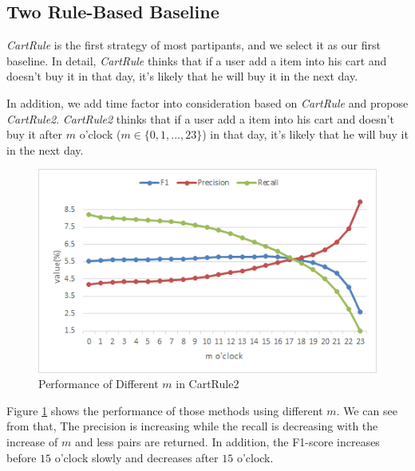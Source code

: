 \documentclass{llncs}
\begin{document}
\subsection{Two Rule-Based Baseline}
\emph{CartRule} is the first strategy of most partipants, and we select it as our first baseline.
In detail, \emph{CartRule} thinks that if a user add a item into his cart and doesn't buy it in that day,
it's likely that he will buy it in the next day.

In addition, we add time factor into consideration based on \emph{CartRule}
and propose \emph{CartRule2}.
\emph{CartRule2} thinks that if a user add a item into his cart and doesn't buy it
after $m$ o'clock ($ m \in \{ 0, 1, ..., 23 \} $) in that day,
it's likely that he will buy it in the next day.

\begin{figure}[htbp]
	\centering
	\includegraphics[scale=0.6]{images/rule.png}
	\caption{Performance of Different $m$ in CartRule2}
	\label{fig:rule}
\end{figure}

Figure \ref{fig:rule} shows the performance of those methods using different $m$.
We can see from that,
The precision is increasing while the recall is decreasing
with the increase of $m$ and less pairs are returned.
In addition, the F1-score increases before $15$ o'clock slowly
and decreases after $15$ o'clock.
\end{document}
